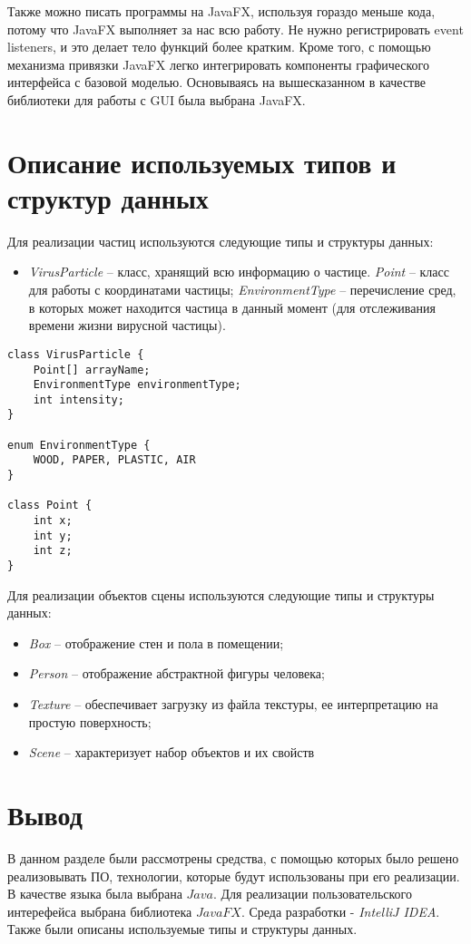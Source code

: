 Также можно писать программы на JavaFX, используя гораздо меньше кода, потому что JavaFX выполняет за нас всю работу. Не нужно регистрировать event listeners, и это делает тело функций более кратким. Кроме того, с помощью механизма привязки JavaFX легко интегрировать компоненты графического интерфейса с базовой моделью. Основываясь на вышесказанном в качестве библиотеки для работы с GUI была выбрана JavaFX.

\section{Описание используемых типов и структур данных}

Для реализации частиц используются следующие типы и структуры данных:
\begin{itemize} 
	\item \textit{VirusParticle} -- класс, хранящий всю информацию о частице.
	\subitem  \textit{Point} -- класс для работы с координатами частицы;
	\subitem \textit{EnvironmentType} -- перечисление сред, в которых может находится частица в данный момент (для отслеживания времени жизни вирусной частицы).
\end{itemize}

\begin{center}
	\captionsetup{justification=raggedright,singlelinecheck=off}
	\begin{lstlisting}[label=lst:sphere,caption=Структуры данных для хранени информации о частицах вируса]
class VirusParticle {
	Point[] arrayName;
	EnvironmentType environmentType;
	int intensity;
}
		
enum EnvironmentType {
	WOOD, PAPER, PLASTIC, AIR
}
		
class Point {
	int x;
	int y;
	int z;
}
	\end{lstlisting}
\end{center}

Для реализации объектов сцены используются следующие типы и структуры данных:

\begin{itemize} 
	\item \textit{Box} -- отображение стен и пола в помещении;
	\item \textit{Person} -- отображение абстрактной фигуры человека;
	\item \textit{Texture} -- обеспечивает загрузку из файла текстуры, ее интерпретацию на простую поверхность;
	\item \textit{Scene} -- характеризует набор объектов и их свойств
\end{itemize}


\section*{Вывод}

В данном разделе были рассмотрены средства, с помощью которых было решено реализовывать ПО, технологии, которые будут использованы при его реализации. В качестве языка была выбрана $Java$.  Для реализации пользовательского интерефейса выбрана библиотека $JavaFX$. Среда разработки -  \textit{IntelliJ IDEA}. Также были описаны используемые типы и структуры данных.
